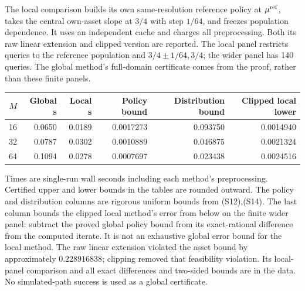 \documentclass[11pt,a4paper]{article}
\begin{document}
The local comparison builds its own same-resolution reference policy at
$\mu^{\rm ref}$, takes the central own-asset slope at $3/4$ with step $1/64$,
and freezes population dependence. It uses an independent cache and charges
all preprocessing. Both its raw linear extension and clipped version are
reported. The local panel restricts queries to the reference population and
$3/4\pm1/64,3/4$; the wider panel has 140 queries. The global method's
full-domain certificate comes from the proof, rather than these finite panels.

\begin{center}\small
\begin{tabular}{r|rr|rr|r}
$M$ & Global s & Local s & Policy bound & Distribution bound & Clipped local lower\\\hline
16 & 0.0650 & 0.0189 & 0.0017273 & 0.093750 & 0.0014940 \\
32 & 0.0787 & 0.0302 & 0.0010889 & 0.046875 & 0.0021324 \\
64 & 0.1094 & 0.0278 & 0.0007697 & 0.023438 & 0.0024516 \\
\end{tabular}
\end{center}
Times are single-run wall seconds including each method's preprocessing.
Certified upper and lower bounds in the tables are rounded outward.
The policy and distribution columns are rigorous uniform bounds from
\textup{(S12),(S14)}. The last column bounds the clipped local method's error
from below on the finite wider panel: subtract the proved global policy bound
from its exact-rational difference from the computed iterate. It is not an
exhaustive global error bound for the local method. The raw linear extension
violated the asset bound by approximately $0.228916838$; clipping removed
that feasibility violation. Its local-panel comparison and all exact
differences and two-sided bounds are in the data. No simulated-path success
is used as a global certificate.
\end{document}
